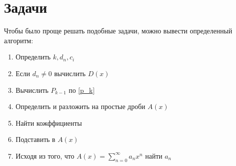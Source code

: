 \section{Задачи}
Чтобы было проще решать подобные задачи, можно вывести определенный алгоритм:
\begin{enumerate}
    \item Определить $k, d_n, c_i$
    \item Если $d_n \neq 0$ вычислить $D(x)$
    \item Вычислить $P_{k-1}$ по \ref{p_k}
    \item Определить и разложить на простые дроби $A(x)$
    \item Найти кожффициенты
    \item Подставить в $A(x)$
    \item Исходя из того, что $A(x) = \sum_{n = 0}^{\infty} a_n x^n$ найти $a_n$
\end{enumerate}
